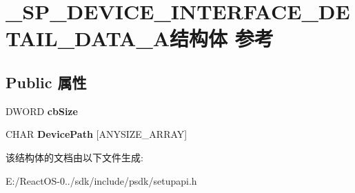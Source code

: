 \hypertarget{struct___s_p___d_e_v_i_c_e___i_n_t_e_r_f_a_c_e___d_e_t_a_i_l___d_a_t_a___a}{}\section{\+\_\+\+S\+P\+\_\+\+D\+E\+V\+I\+C\+E\+\_\+\+I\+N\+T\+E\+R\+F\+A\+C\+E\+\_\+\+D\+E\+T\+A\+I\+L\+\_\+\+D\+A\+T\+A\+\_\+\+A结构体 参考}
\label{struct___s_p___d_e_v_i_c_e___i_n_t_e_r_f_a_c_e___d_e_t_a_i_l___d_a_t_a___a}
\subsection*{Public 属性}
\begin{DoxyCompactItemize}
\item 
\mbox{\label{struct___s_p___d_e_v_i_c_e___i_n_t_e_r_f_a_c_e___d_e_t_a_i_l___d_a_t_a___a_a28d58ca132b4b00b542a7a614ee7b553}} 
D\+W\+O\+RD {\bfseries cb\+Size}
\item 
\mbox{\label{struct___s_p___d_e_v_i_c_e___i_n_t_e_r_f_a_c_e___d_e_t_a_i_l___d_a_t_a___a_a107fe447694720dc61017b372f67b683}} 
C\+H\+AR {\bfseries Device\+Path} \mbox{[}A\+N\+Y\+S\+I\+Z\+E\+\_\+\+A\+R\+R\+AY\mbox{]}
\end{DoxyCompactItemize}


该结构体的文档由以下文件生成\+:\begin{DoxyCompactItemize}
\item 
E\+:/\+React\+O\+S-\/0../sdk/include/psdk/setupapi.\+h\end{DoxyCompactItemize}
